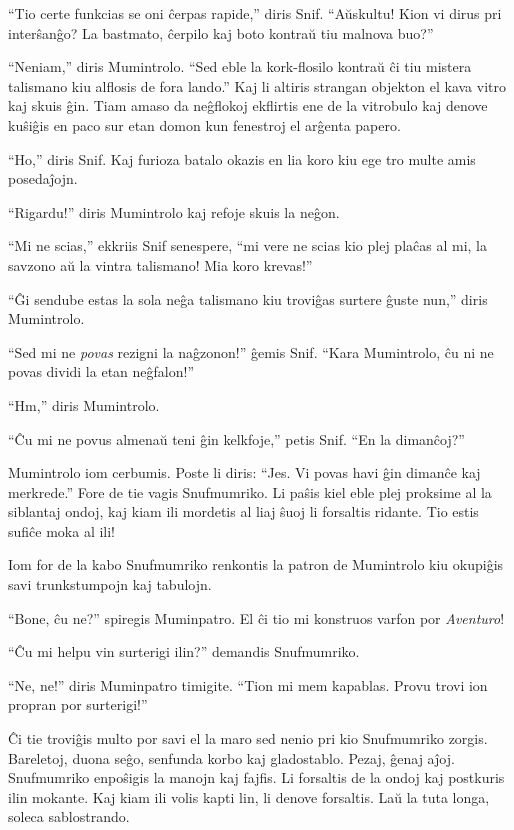``Tio certe funkcias se oni ĉerpas rapide,'' diris Snif. ``Aŭskultu! Kion vi dirus pri interŝanĝo? La bastmato, ĉerpilo kaj boto kontraŭ tiu malnova buo?''

``Neniam,'' diris Mumintrolo. ``Sed eble la kork-flosilo kontraŭ ĉi tiu mistera talismano kiu alflosis de fora lando.'' Kaj li altiris strangan objekton el kava vitro kaj skuis ĝin. Tiam amaso da neĝflokoj ekflirtis ene de la vitrobulo kaj denove kuŝiĝis en paco sur etan domon kun fenestroj el arĝenta papero.

``Ho,'' diris Snif. Kaj furioza batalo okazis en lia koro kiu ege tro multe amis posedaĵojn.

``Rigardu!'' diris Mumintrolo kaj refoje skuis la neĝon.

``Mi ne scias,'' ekkriis Snif senespere, ``mi vere ne scias kio plej plaĉas al mi, la savzono aŭ la vintra talismano! Mia koro krevas!''

``Ĝi sendube estas la sola neĝa talismano kiu troviĝas surtere ĝuste nun,'' diris Mumintrolo.

``Sed mi ne \emph{povas} rezigni la naĝzonon!'' ĝemis Snif. ``Kara Mumintrolo, ĉu ni ne povas dividi la etan neĝfalon!''

``Hm,'' diris Mumintrolo.

``Ĉu mi ne povus almenaŭ teni ĝin kelkfoje,'' petis Snif. ``En la dimanĉoj?''

Mumintrolo iom cerbumis. Poste li diris: ``Jes. Vi povas havi ĝin dimanĉe kaj merkrede.''
\sectionbreak
Fore de tie vagis Snufmumriko. Li paŝis kiel eble plej proksime al la siblantaj ondoj, kaj kiam ili mordetis al liaj ŝuoj li forsaltis ridante. Tio estis sufiĉe moka al ili!

Iom for de la kabo Snufmumriko renkontis la patron de Mumintrolo kiu okupiĝis savi trunkstumpojn kaj tabulojn.

``Bone, ĉu ne?'' spiregis Muminpatro. El ĉi tio mi konstruos varfon por \emph{Aventuro}!

``Ĉu mi helpu vin surterigi ilin?'' demandis Snufmumriko.

``Ne, ne!'' diris Muminpatro timigite. ``Tion mi mem kapablas. Provu trovi ion propran por surterigi!''

Ĉi tie troviĝis multo por savi el la maro sed nenio pri kio Snufmumriko zorgis. Bareletoj, duona seĝo, senfunda korbo kaj gladostablo. Pezaj, ĝenaj aĵoj. Snufmumriko enpoŝigis la manojn kaj fajfis. Li forsaltis de la ondoj kaj postkuris ilin mokante. Kaj kiam ili volis kapti lin, li denove forsaltis. Laŭ la tuta longa, soleca sablostrando.

